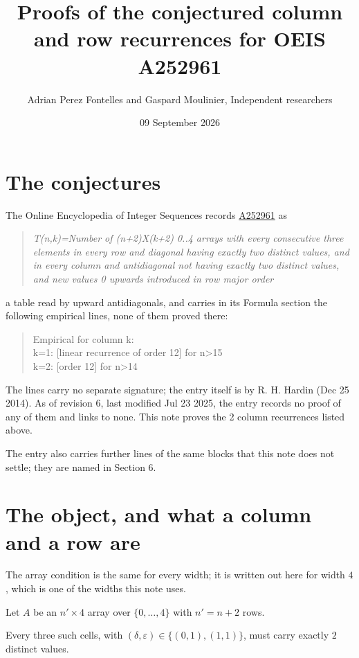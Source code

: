 \documentclass[11pt]{article}
\title{Proofs of the conjectured column and row recurrences for OEIS A252961}
\author{Adrian Perez Fontelles and Gaspard Moulinier, Independent researchers}
\date{09 September 2026}
\theoremstyle{definition}
\begin{document}
\maketitle
\section{The conjectures}

The Online Encyclopedia of Integer Sequences records \href{https://oeis.org/A252961}{A252961} as

\begin{quote}\itshape T(n,k)=Number of (n+2)X(k+2) 0..4 arrays with every consecutive three elements in every row and diagonal having exactly two distinct values, and in every column and antidiagonal not having exactly two distinct values, and new values 0 upwards introduced in row major order\end{quote}

a table read by upward antidiagonals, and carries in its Formula section the following empirical lines, none of them proved there:

\begin{quote}\ttfamily Empirical for column k:\\
k=1: [linear recurrence of order 12] for n>15\\k=2: [order 12] for n>14\end{quote}

The lines carry no separate signature; the entry itself is by R. H. Hardin (Dec 25 2014). As of revision 6, last modified Jul 23 2025, the entry records no proof of any of them and links to none. This note proves the 2 column recurrences listed above.

The entry also carries further lines of the same blocks that this note does not settle; they are named in Section 6.

\section{The object, and what a column and a row are}

The array condition is the same for every width; it is written out here for width $4$, which is one of the widths this note uses.

Let $A$ be an $n' \times 4$ array over $\{0,\dots,4\}$ with $n' = n + 2$ rows.

Every three such cells, with $(\delta,\varepsilon) \in \{(0,1), (1,1)\}$, must carry exactly $2$ distinct values.
\end{document}
